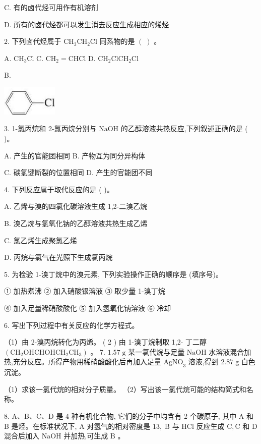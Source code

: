 \documentclass[10pt]{article}
\begin{document}
C. 有的卤代烃可用作有机溶剂

D. 所有的卤代烃都可以发生消去反应生成相应的烯烃

2. 下列卤代烃属于 \({\mathrm{{CH}}}_{3}{\mathrm{{CH}}}_{2}\mathrm{{Cl}}\) 同系物的是 \(\left( \;\right)\) 。

A. \({\mathrm{{CH}}}_{3}\mathrm{{Cl}}\) C. \({\mathrm{{CH}}}_{2} = \mathrm{{CHCl}}\) D. \({\mathrm{{CH}}}_{2}{\mathrm{{ClCH}}}_{2}\mathrm{{Cl}}\)

B.

\begin{center}
\includegraphics[max width=0.2\textwidth]{images/0190efc5-b58a-7c43-bfb0-e0a030df9cfd_63_975920.jpg}
\end{center}

3. 1-氯丙烷和 2-氯丙烷分别与 \(\mathrm{{NaOH}}\) 的乙醇溶液共热反应,下列叙述正确的是 ( )。

A. 产生的官能团相同 B. 产物互为同分异构体

C. 碳氢键断裂的位置相同 D. 产生的官能团不同

4. 下列反应属于取代反应的是 ( )。

A. 乙烯与溴的四氯化碳溶液生成 1,2-二溴乙烷

B. 溴乙烷与氢氧化钠的乙醇溶液共热生成乙烯

C. 氯乙烯生成聚氯乙烯

D. 丙烷与氯气在光照下生成氯丙烷

5. 为检验 1-溴丁烷中的溴元素, 下列实验操作正确的顺序是 (填序号)。

① 加热煮沸 ② 加入硝酸银溶液 ③ 取少量 1-溴丁烷

④ 加入足量稀硝酸酸化 ⑤ 加入氢氧化钠溶液 ⑥ 冷却

6. 写出下列过程中有关反应的化学方程式。

（1）由 2-溴丙烷转化为丙烯。 ( 2 ) 由 1-溴丁烷制取 1,2- 丁二醇 \(\left( {{\mathrm{{CH}}}_{2}{\mathrm{{OHCHOHCH}}}_{2}{\mathrm{{CH}}}_{3}}\right)\) 。 7. \({1.57}\mathrm{\;g}\) 某一氯代烷与足量 \(\mathrm{{NaOH}}\) 水溶液混合加热,充分反应。所得产物用稀硝酸酸化后再加入足量 \({\mathrm{{AgNO}}}_{3}\) 溶液,得到 \({2.87}\mathrm{\;g}\) 白色沉淀。

（1）求该一氯代烷的相对分子质量。 （2）写出该一氯代烷可能的结构简式和名称。

8. A、B、C、D 是 4 种有机化合物, 它们的分子中均含有 2 个碳原子, 其中 A 和 B 是烃。在标准状况下, \(\mathrm{A}\) 对氢气的相对密度是 \({13},\mathrm{\;B}\) 与 \(\mathrm{{HCl}}\) 反应生成 \(\mathrm{C},\mathrm{C}\) 和 \(\mathrm{D}\) 混合后加入 \(\mathrm{{NaOH}}\) 并加热,可生成 \(\mathrm{B}\) 。
\end{document}
